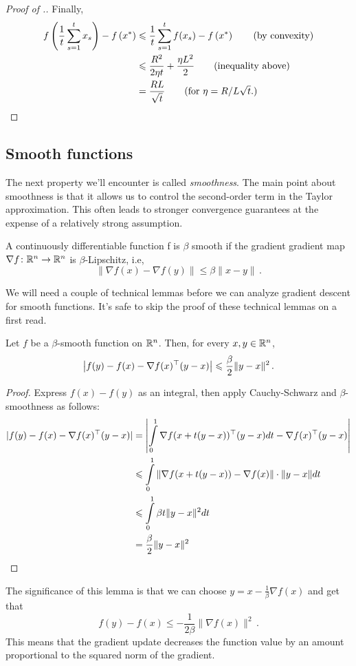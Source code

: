 \begin{proof}[Proof of .]
Finally,
\begin{align*}
    f\left(\frac{1}{t}\sum_{s=1}^t x_s\right) - f\left(x^*\right)
&\leq \frac{1}{t} \sum_{s=1}^t f(x_s) - f\left(x^*\right) \tag{by convexity} \\
&\leq \frac{R^2}{2\eta t} + \frac{\eta L^2}{2} \tag{inequality above}\\
&=\frac{RL}{\sqrt{t}} \tag{for $\eta=R/L\sqrt{t}.$}
\end{align*}

\end{proof}

\subsection{Smooth functions}

The next property we'll encounter is called \emph{smoothness}.  The main point
about smoothness is that it allows us to control the second-order term in the
Taylor approximation. This often leads to stronger convergence guarantees at the
expense of a relatively strong assumption.

\begin{definition}[Smoothness]
A continuously differentiable function f is $\beta$ smooth if the gradient
gradient map $\nabla f\colon\mathbb{R}^n\to\mathbb{R}^n$ is $\beta$-Lipschitz, i.e,
\[
\|\nabla f(x) - \nabla f(y)\| \leq \beta\|x-y\|\,.
\]
\end{definition}

We will need a couple of technical lemmas before we can analyze gradient descent
for smooth functions. It's safe to skip the proof of these technical lemmas on a
first read.

\begin{lemma}
Let $f$ be a $\beta$-smooth function on $\mathbb{R}^n$.  Then, for every $x,y \in \mathbb{R}^n$, 
\[
\left|f(y) - f(x) - \nabla f(x)^\top(y-x)\right| \leqslant \frac{\beta}{2}\|y-x\|^2\,.
\]
\end{lemma}

\begin{proof}
Express $f(x) - f(y)$ as an integral, then apply Cauchy-Schwarz and 
$\beta$-smoothness as follows:
\begin{align*}
|f(y) - f(x) - \nabla f(x)^\top(y-x)|
&=\left|\int\limits_{0}^1 \nabla f(x + t(y-x))^\top(y-x)dt - \nabla
f(x)^\top(y-x)\right|\\
&\leqslant  \int\limits_{0}^1 \|\nabla f(x + t(y-x)) - \nabla f(x)\|\cdot \|y-x\|dt\\
&\leqslant \int\limits_{0}^1 \beta t\|y-x\|^2dt\\
&= \frac{\beta}{2}\|y-x\|^2\qedhere
\end{align*}
\end{proof}
The significance of this lemma is that we can choose $y=x-\frac1\beta\nabla f(x)$ and
get that 
\[
f(y)-f(x)\le -\frac{1}{2\beta}\|\nabla f(x)\|^2\,.
\]
This means that the gradient update decreases the function value by an amount
proportional to the squared norm of the gradient.

